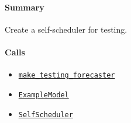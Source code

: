 \documentclass[11pt]{report}
\begin{document}
\paragraph{Summary} Create a self-scheduler for testing.
\paragraph{Calls}
\begin{itemize}[leftmargin=*]
  \item \hyperref[def:tests-util.py:make_testing_forecaster:L337]{\texttt{make\_testing\_forecaster}}
  \item \hyperref[def:tests-util.py:ExampleModel:L25]{\texttt{ExampleModel}}
  \item \hyperref[def:bidder.py:SelfScheduler:L780]{\texttt{SelfScheduler}}
\end{itemize}
\end{document}
